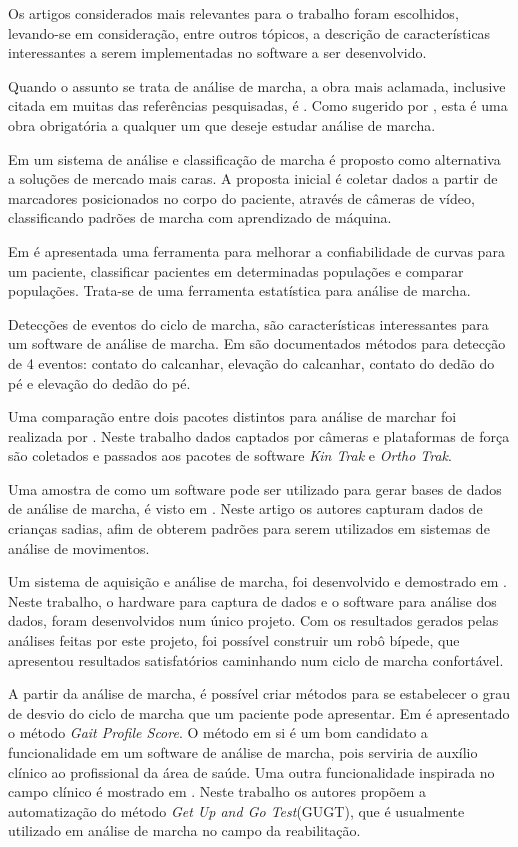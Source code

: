 Os artigos considerados mais relevantes para o trabalho foram escolhidos, levando-se em consideração, entre outros tópicos, a descrição de características interessantes a serem implementadas no software a ser desenvolvido.

Quando o assunto se trata de análise de marcha, a obra mais aclamada, inclusive citada em muitas das referências pesquisadas, é .
Como sugerido por , esta é uma obra obrigatória a qualquer um que deseje estudar análise de marcha.

Em  um sistema de análise e classificação de marcha é proposto como alternativa a soluções de mercado mais caras.
A proposta inicial é coletar dados a partir de marcadores posicionados no corpo do paciente, através de câmeras de vídeo, classificando padrões de marcha com aprendizado de máquina.

Em  é apresentada uma ferramenta para melhorar a confiabilidade de curvas para um paciente, classificar pacientes em determinadas populações e comparar populações.
Trata-se de uma ferramenta estatística para análise de marcha.

Detecções de eventos do ciclo de marcha, são características interessantes para um software de análise de marcha. 
Em  são documentados métodos para detecção de 4 eventos: contato do calcanhar, elevação do calcanhar, contato do dedão do pé e elevação do dedão do pé.

Uma comparação entre dois pacotes distintos para análise de marchar foi realizada por . 
Neste trabalho dados captados por câmeras e plataformas de força são coletados e passados aos pacotes de software \emph{Kin Trak} e \emph{Ortho Trak}.

Uma amostra de como um software pode ser utilizado para gerar bases de dados de análise de marcha, é visto em . Neste artigo os autores capturam dados de crianças sadias, afim de obterem padrões para serem utilizados em sistemas de análise de movimentos.

Um sistema de aquisição e análise de marcha, foi desenvolvido e demostrado em . 
Neste trabalho, o hardware para captura de dados e o software para análise dos dados, foram desenvolvidos num único projeto.
Com os resultados gerados pelas análises feitas por este projeto, foi possível construir um robô bípede, que apresentou resultados satisfatórios caminhando num ciclo de marcha confortável.

A partir da análise de marcha, é possível criar métodos para se estabelecer o grau de desvio do ciclo de marcha que um paciente pode apresentar.
Em  é apresentado o método \emph{Gait Profile Score}.
O método em si é um bom candidato a funcionalidade em um software de análise de marcha, pois serviria de auxílio clínico ao profissional da área de saúde.
Uma outra funcionalidade inspirada no campo clínico é mostrado em . Neste trabalho os autores 
propõem a automatização do método \emph{Get Up and Go Test}(GUGT), que é usualmente utilizado em análise de marcha no campo da reabilitação.


 
